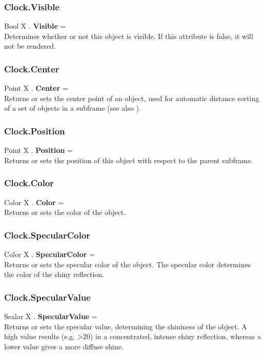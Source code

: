 \subsubsection{Clock.Visible \label{F:Clock:Visible}}
Bool X . \textbf{Visible} = \\
Determines whether or not this object is visible. If this attribute is false, it will not be rendered.

\subsubsection{Clock.Center \label{F:Clock:Center}}
Point X . \textbf{Center} = \\
Returns or sets the center point of an object, used for automatic distance sorting of a set of objects in a subframe (see also ).

\subsubsection{Clock.Position \label{F:Clock:Position}}
Point X . \textbf{Position} = \\
Returns or sets the position of this object with respect to the parent subframe.

\subsubsection{Clock.Color \label{F:Clock:Color}}
Color X . \textbf{Color} = \\
Returns or sets the color of the object.

\subsubsection{Clock.SpecularColor \label{F:Clock:SpecularColor}}
Color X . \textbf{SpecularColor} = \\
Returns or sets the specular color of the object. The specular color determines the color of the shiny reflection.

\subsubsection{Clock.SpecularValue \label{F:Clock:SpecularValue}}
Scalar X . \textbf{SpecularValue} = \\
Returns or sets the specular value, determining the shininess of the object. A high value results (e.g. >20) in a concentrated, intense shiny reflection, whereas a lower value gives a more diffuse shine.

